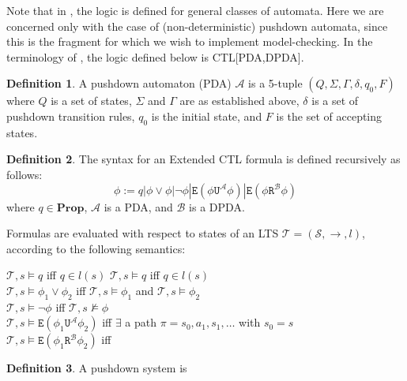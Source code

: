 \documentclass[11pt]{article}
\theoremstyle{definition}
\newtheorem{mydef}{Definition}
\begin{document}
Note that in \cite{Kreutzer10}, the logic is defined for general classes of
automata. Here we are concerned only with the case of (non-deterministic) %
pushdown automata, since this is the fragment for which we wish to implement
model-checking. In the terminology of \cite{Kreutzer10}, the logic defined
below is CTL[PDA,DPDA].

\begin{mydef}
A pushdown automaton (PDA) $\mathcal{A}$ is a 5-tuple $(Q, \Sigma, \Gamma, \delta, q_0, F)$ where
$Q$ is a set of states, $\Sigma$ and $\Gamma$ are as established above,
$\delta$ is a set of pushdown transition rules, $q_0$ is the initial state, and
$F$ is the set of accepting states.
\end{mydef}

\begin{mydef}
The syntax for an Extended CTL formula is defined recursively as follows:
   \[ \phi := q | \phi \vee \phi | \neg \phi | \texttt{E}(\phi \texttt{U}^\mathcal{A} \phi) | \texttt{E}(\phi
   \texttt{R}^\mathcal{B} \phi) \]
where $q \in \textbf{Prop}$, $\mathcal{A}$ is a PDA, and $\mathcal{B}$ is a DPDA.

Formulas are evaluated with respect to states of an LTS $\mathcal{T} = (\mathcal{S},
\rightarrow, l)$, according to the following semantics:

$\mathcal{T}, s \models q$ iff $q \in l(s)$
$\mathcal{T}, s \models q$ iff $q \in l(s)$ \\
$\mathcal{T}, s \models \phi_1 \vee \phi_2$ iff $\mathcal{T}, s \models \phi_1$
and $\mathcal{T}, s \models \phi_2$ \\
$\mathcal{T}, s \models \neg \phi $ iff $\mathcal{T}, s \not\models \phi$ \\
$\mathcal{T}, s \models \texttt{E}(\phi_1 \texttt{U}^\mathcal{A} \phi_2) $ iff 
$\exists$ a path $\pi = s_0, a_1, s_1, \dots$ with $s_0 = s$
\\ %
$\mathcal{T}, s \models \texttt{E}(\phi_1 \texttt{R}^\mathcal{B} \phi_2) $ iff \\ %
\end{mydef}

\begin{mydef} A pushdown system is \end{mydef}
\end{document}
